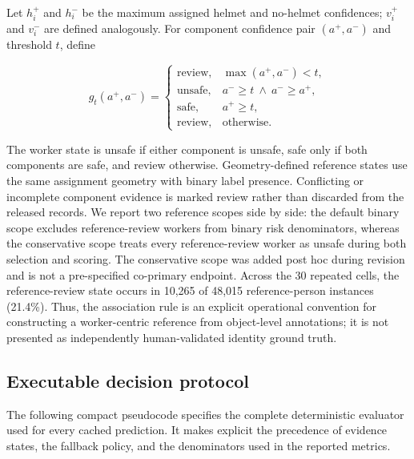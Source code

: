 \documentclass[iicol,pdflatex,sn-mathphys-num]{sn-jnl}
\begin{document}
Let $h_i^+$ and $h_i^-$ be the maximum assigned helmet and no-helmet confidences; $v_i^+$ and $v_i^-$ are defined analogously. For component confidence pair $(a^+,a^-)$ and threshold $t$, define

\begin{equation}
g_t(a^+,a^-)=
\begin{cases}
\mathrm{review}, & \max(a^+,a^-)<t,\\
\mathrm{unsafe}, & a^-\geq t\ \wedge\ a^-\geq a^+,\\
\mathrm{safe}, & a^+\geq t,\\
\mathrm{review}, & \text{otherwise}.
\end{cases}
\end{equation}

The worker state is unsafe if either component is unsafe, safe only if both components are safe, and review otherwise. Geometry-defined reference states use the same assignment geometry with binary label presence. Conflicting or incomplete component evidence is marked review rather than discarded from the released records. We report two reference scopes side by side: the default binary scope excludes reference-review workers from binary risk denominators, whereas the conservative scope treats every reference-review worker as unsafe during both selection and scoring. The conservative scope was added post hoc during revision and is not a pre-specified co-primary endpoint. Across the 30 repeated cells, the reference-review state occurs in 10,265 of 48,015 reference-person instances (21.4\%). Thus, the association rule is an explicit operational convention for constructing a worker-centric reference from object-level annotations; it is not presented as independently human-validated identity ground truth.

\subsection{Executable decision protocol}
The following compact pseudocode specifies the complete deterministic evaluator used for every cached prediction. It makes explicit the precedence of evidence states, the fallback policy, and the denominators used in the reported metrics.
\end{document}
